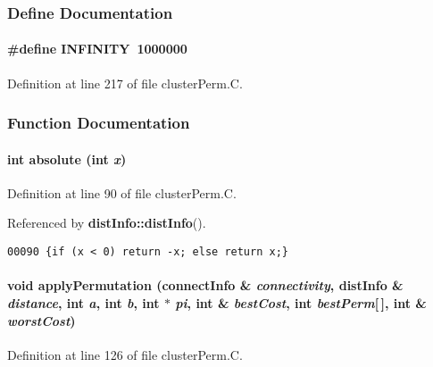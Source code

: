\subsubsection{Define Documentation}
\label{clusterPerm.C_a0}
\paragraph{\setlength{\rightskip}{0pt plus 5cm}\#define INFINITY\ 1000000}\hfill



Definition at line 217 of file cluster\-Perm.C.

\subsubsection{Function Documentation}
\label{clusterPerm.C_a1}
\paragraph{\setlength{\rightskip}{0pt plus 5cm}int absolute (int {\em x})\hspace{0.3cm}{\tt  [inline, static]}}\hfill



Definition at line 90 of file cluster\-Perm.C.

Referenced by {\bf dist\-Info::dist\-Info}().\small\begin{verbatim}00090 {if (x < 0) return -x; else return x;}
\end{verbatim}\normalsize 
\label{clusterPerm.C_a3}
\paragraph{\setlength{\rightskip}{0pt plus 5cm}void apply\-Permutation ({\bf connect\-Info} \& {\em connectivity}, {\bf dist\-Info} \& {\em distance}, int {\em a}, int {\em b}, int $\ast$ {\em pi}, int \& {\em best\-Cost}, int {\em best\-Perm}[$\,$], int \& {\em worst\-Cost})}\hfill



Definition at line 126 of file cluster\-Perm.C.

